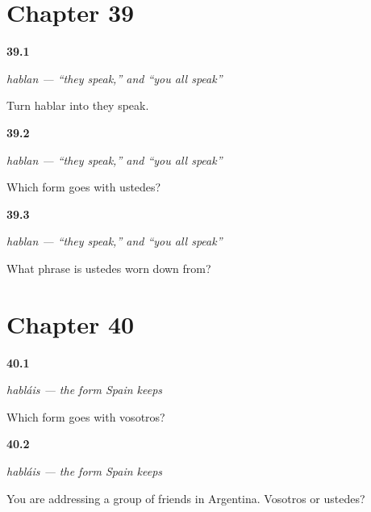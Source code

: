 \section*{Chapter 39}

\noindent\begin{minipage}[t]{\linewidth}
\raggedright
\hypertarget{review-ES-C07-hablan-form}{\textbf{39.1}} \emph{hablan — \textquotedblleft{}they speak,\textquotedblright{} and \textquotedblleft{}you all speak\textquotedblright{}}\par
\small Turn hablar into they speak.
\end{minipage}\par\medskip

\noindent\begin{minipage}[t]{\linewidth}
\raggedright
\hypertarget{review-ES-C07-hablan-ustedes}{\textbf{39.2}} \emph{hablan — \textquotedblleft{}they speak,\textquotedblright{} and \textquotedblleft{}you all speak\textquotedblright{}}\par
\small Which form goes with ustedes?
\end{minipage}\par\medskip

\noindent\begin{minipage}[t]{\linewidth}
\raggedright
\hypertarget{review-ES-C07-hablan-why}{\textbf{39.3}} \emph{hablan — \textquotedblleft{}they speak,\textquotedblright{} and \textquotedblleft{}you all speak\textquotedblright{}}\par
\small What phrase is ustedes worn down from?
\end{minipage}\par\medskip

\section*{Chapter 40}

\noindent\begin{minipage}[t]{\linewidth}
\raggedright
\hypertarget{review-ES-C07-hablais-form}{\textbf{40.1}} \emph{habláis — the form Spain keeps}\par
\small Which form goes with vosotros?
\end{minipage}\par\medskip

\noindent\begin{minipage}[t]{\linewidth}
\raggedright
\hypertarget{review-ES-C07-hablais-where}{\textbf{40.2}} \emph{habláis — the form Spain keeps}\par
\small You are addressing a group of friends in Argentina. Vosotros or ustedes?
\end{minipage}\par\medskip


